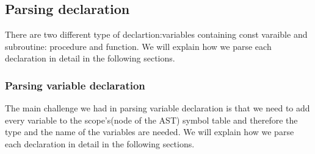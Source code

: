 \documentclass[12pt]{article}
\begin{document}
\subsection{Parsing declaration}
There are two different type of declartion:variables containing const varaible and subroutine: procedure and function.
We will explain how we parse each declaration in detail in the following sections.

\subsubsection{Parsing variable declaration}
The main challenge we had in parsing variable declaration is that we need to add every variable to the scope’s(node of the AST) symbol table and therefore the type and the name of the variables are needed. 
We will explain how we parse each declaration in detail in the following sections.
\end{document}
